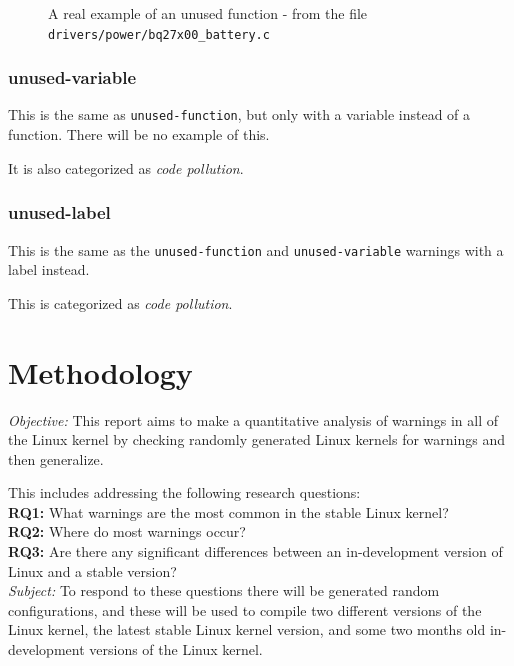 \documentclass[a4paper,11pt]{report}
\newcommand{\figa}{
    \begin{figure}[!htpb]
    \centering
}
\newcommand{\figb}[2]{
    \caption{#1}
    \label{#2}
    \end{figure}
}
\begin{document}
\figa
    
\figb{A real example of an unused function - from the file 
    \texttt{drivers/power/bq27x00\_battery.c}}{lst:unusedfuncreal}


            \subsection*{unused-variable}
This is the same as \texttt{unused-function}, but only with a variable instead 
of a function. There will be no example of this.

It is also categorized as \emph{code pollution}.


            \subsection*{unused-label}
This is the same as the \texttt{unused-function} and \texttt{unused-variable} 
warnings with a label instead.

This is categorized as \emph{code pollution}.




\newpage
\chapter{Methodology}

\emph{Objective:}
This report aims to make a quantitative analysis of warnings in all of the
Linux kernel by checking randomly generated Linux kernels for warnings and 
then generalize.

This includes addressing the following research questions:
\\

\textbf{RQ1:} What warnings are the most common in the stable Linux kernel?
\\

\textbf{RQ2:} Where do most warnings occur?
\\

\textbf{RQ3:} Are there any significant differences between an in-development 
version of Linux and a stable version?
\\

\emph{Subject:}
To respond to these questions there will be generated random configurations, 
and these will be used to compile two different versions of the Linux kernel, 
the latest stable Linux kernel version, and some two months old in-development 
versions of the Linux kernel.
\end{document}
